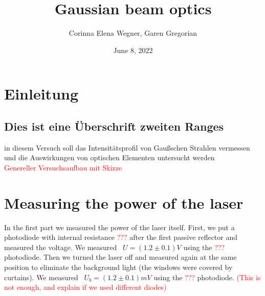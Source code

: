 \documentclass{article}
\begin{document}
 

\title{Gaussian beam optics}
\author{Corinna Elena Wegner, Garen Gregorian}
\date{June 8, 2022}
\maketitle %
\newpage
\tableofcontents
\newpage

\section{Einleitung} %
\subsection{Dies ist eine Überschrift zweiten Ranges}

in diesem Versuch soll das Intensitätsprofil von Gaußschen Strahlen vermessen und die Auswirkungen von optischen Elementen untersucht werden\\

\textcolor{red}{Genereller Versuchsaufbau mit Skizze}\\

\section{Measuring the power of the laser}

In the first part we measured the power of the laser itself. First, we put a photodiode with internal resistance 
\textcolor{red}{???}
after the first passive reflector and measured the voltage. We measured 
\ $U=(1.2 \pm 0.1) V$ %
using the 
\textcolor{red}{???}
photodiode. Then we turned the laser off and measured again at the same position to eliminate the background light (the windows were covered by curtains). We measured 
\ $U_b = (1.2 \pm 0.1)mV$ 
using the 
\textcolor{red}{???}
photodiode. 
\textcolor{red}{(This is not enough, and explain if we used different diodes)} 
\end{document}
